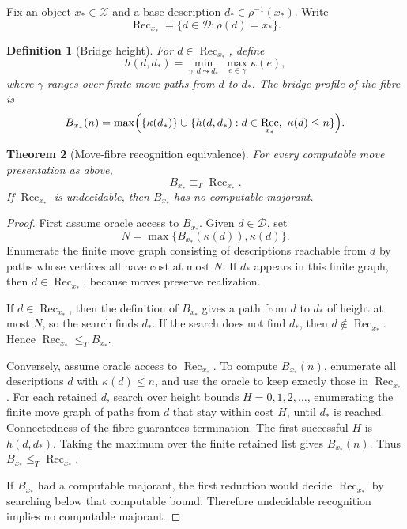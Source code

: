 \documentclass[11pt]{article}
\newtheorem{theorem}{Theorem}[section]
\newtheorem{definition}[theorem]{Definition}
\DeclareMathOperator{\Rec}{Rec}
\begin{document}
Fix an object \(x_\ast\in\mathcal X\) and a base description \(d_\ast\in\rho^{-1}(x_\ast)\). Write
\[
\Rec_{x_\ast}=\{d\in\mathcal D:\rho(d)=x_\ast\}.
\]

\begin{definition}[Bridge height]
For \(d\in\Rec_{x_\ast}\), define
\[
h(d,d_\ast)=
\min_{\gamma:d\leadsto d_\ast}\ \max_{e\in\gamma}\kappa(e),
\]
where \(\gamma\) ranges over finite move paths from \(d\) to \(d_\ast\). The bridge profile of the fibre is
\[
B_{x_\ast}(n)=
\max\Bigl(\{\kappa(d_\ast)\}\cup
\{h(d,d_\ast):d\in\Rec_{x_\ast},\ \kappa(d)\leq n\}\Bigr).
\]
\end{definition}

\begin{theorem}[Move-fibre recognition equivalence]
For every computable move presentation as above,
\[
B_{x_\ast}\equiv_T \Rec_{x_\ast}.
\]
If \(\Rec_{x_\ast}\) is undecidable, then \(B_{x_\ast}\) has no computable majorant.
\end{theorem}

\begin{proof}
First assume oracle access to \(B_{x_\ast}\). Given \(d\in\mathcal D\), set
\[
N=\max\{B_{x_\ast}(\kappa(d)),\kappa(d)\}.
\]
Enumerate the finite move graph consisting of descriptions reachable from \(d\) by paths whose vertices all have cost at most \(N\). If \(d_\ast\) appears in this finite graph, then \(d\in\Rec_{x_\ast}\), because moves preserve realization.

If \(d\in\Rec_{x_\ast}\), then the definition of \(B_{x_\ast}\) gives a path from \(d\) to \(d_\ast\) of height at most \(N\), so the search finds \(d_\ast\). If the search does not find \(d_\ast\), then \(d\notin\Rec_{x_\ast}\). Hence \(\Rec_{x_\ast}\leq_T B_{x_\ast}\).

Conversely, assume oracle access to \(\Rec_{x_\ast}\). To compute \(B_{x_\ast}(n)\), enumerate all descriptions \(d\) with \(\kappa(d)\leq n\), and use the oracle to keep exactly those in \(\Rec_{x_\ast}\). For each retained \(d\), search over height bounds \(H=0,1,2,\ldots\), enumerating the finite move graph of paths from \(d\) that stay within cost \(H\), until \(d_\ast\) is reached. Connectedness of the fibre guarantees termination. The first successful \(H\) is \(h(d,d_\ast)\). Taking the maximum over the finite retained list gives \(B_{x_\ast}(n)\). Thus \(B_{x_\ast}\leq_T\Rec_{x_\ast}\).

If \(B_{x_\ast}\) had a computable majorant, the first reduction would decide \(\Rec_{x_\ast}\) by searching below that computable bound. Therefore undecidable recognition implies no computable majorant.
\end{proof}
\end{document}
